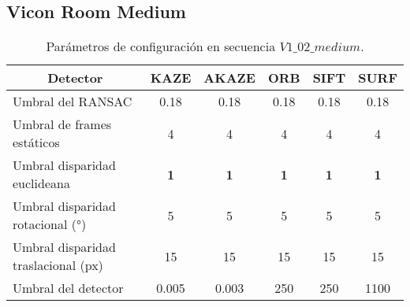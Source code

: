 \subsection{Vicon Room Medium}


\begin{table}[H]
	\caption{Parámetros de configuración  en secuencia $V1\_ 02\_ medium$.}
	\begin{tabular}{|l|c|c|c|c|c|}
		\hline
		\multicolumn{1}{|c|}{\textbf{Detector}} & \textbf{KAZE} & \textbf{AKAZE} & \textbf{ORB} & \textbf{SIFT} & \textbf{SURF} \\ \hline
		Umbral del RANSAC & 0.18 & 0.18 & 0.18 & 0.18 & 0.18 \\ \hline
		Umbral de frames estáticos & 4 & 4 & 4 & 4 & 4 \\ \hline
		Umbral disparidad euclideana & \textbf{1} & \textbf{1} & \textbf{1} & \textbf{1} & \textbf{1} \\ \hline
		Umbral disparidad rotacional (°) & 5 & 5 & 5 & 5 & 5 \\ \hline
		Umbral disparidad traslacional (px) & 15 & 15 & 15 & 15 & 15 \\ \hline
		Umbral del detector & 0.005 & 0.003 & 250 & 250 & 1100 \\ \hline
	\end{tabular}
	\label{Tabla/Parametros/V1_02_medium}
\end{table}

